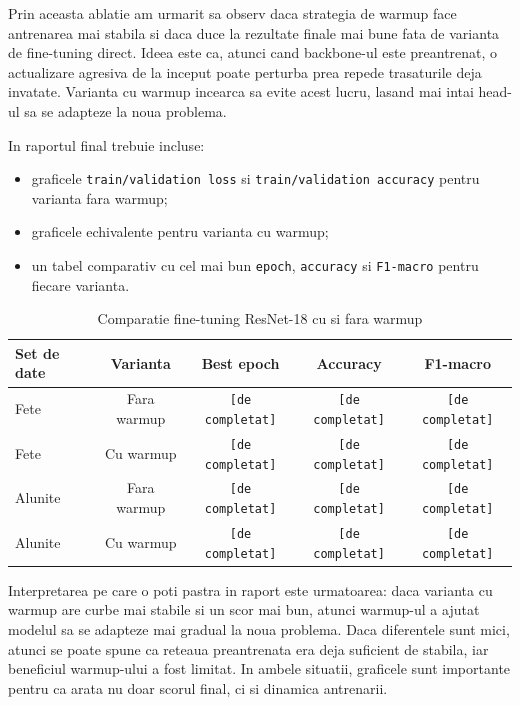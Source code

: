 \documentclass[12pt,a4paper]{article}
\begin{document}
Prin aceasta ablatie am urmarit sa observ daca strategia de warmup face antrenarea mai stabila si daca duce la rezultate finale mai bune fata de varianta de fine-tuning direct. Ideea este ca, atunci cand backbone-ul este preantrenat, o actualizare agresiva de la inceput poate perturba prea repede trasaturile deja invatate. Varianta cu warmup incearca sa evite acest lucru, lasand mai intai head-ul sa se adapteze la noua problema.

In raportul final trebuie incluse:
\begin{itemize}
    \item graficele \texttt{train/validation loss} si \texttt{train/validation accuracy} pentru varianta fara warmup;
    \item graficele echivalente pentru varianta cu warmup;
    \item un tabel comparativ cu cel mai bun \texttt{epoch}, \texttt{accuracy} si \texttt{F1-macro} pentru fiecare varianta.
\end{itemize}

\begin{table}[H]
\centering
\caption{Comparatie fine-tuning ResNet-18 cu si fara warmup}
\begin{tabular}{lcccc}
\toprule
Set de date & Varianta & Best epoch & Accuracy & F1-macro \\
\midrule
Fete & Fara warmup & \texttt{[de completat]} & \texttt{[de completat]} & \texttt{[de completat]} \\
Fete & Cu warmup & \texttt{[de completat]} & \texttt{[de completat]} & \texttt{[de completat]} \\
Alunite & Fara warmup & \texttt{[de completat]} & \texttt{[de completat]} & \texttt{[de completat]} \\
Alunite & Cu warmup & \texttt{[de completat]} & \texttt{[de completat]} & \texttt{[de completat]} \\
\bottomrule
\end{tabular}
\end{table}

Interpretarea pe care o poti pastra in raport este urmatoarea: daca varianta cu warmup are curbe mai stabile si un scor mai bun, atunci warmup-ul a ajutat modelul sa se adapteze mai gradual la noua problema. Daca diferentele sunt mici, atunci se poate spune ca reteaua preantrenata era deja suficient de stabila, iar beneficiul warmup-ului a fost limitat. In ambele situatii, graficele sunt importante pentru ca arata nu doar scorul final, ci si dinamica antrenarii.
\end{document}
